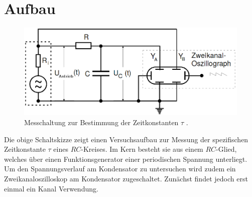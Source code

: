 \section{Aufbau}
\label{sec:Aufbau}


\begin{figure}[H]
 \centering
 \includegraphics[width=\linewidth-200pt,height=\textheight-200pt,keepaspectratio]{content/Aufgabec.png}
 \caption{Messchaltung zur Bestimmung der Zeitkonstanten $\tau$ \cite{V353}.}
 \label{fig:Aufbaua}
\end{figure}
Die obige Schaltskizze zeigt einen Versuchsaufbau zur Messung der spezifischen
 Zeitkonstante $\tau$ eines $RC$-Kreises. Im Kern besteht sie aus einem $RC$-Glied, welches über einen
  Funktionsgenerator einer periodischen Spannung unterliegt. Um den
   Spannungsverlauf am Kondensator zu untersuchen wird zudem ein
    Zweikanaloszilloskop am Kondensator zugeschaltet. Zunächst findet jedoch
     erst einmal ein Kanal Verwendung.
